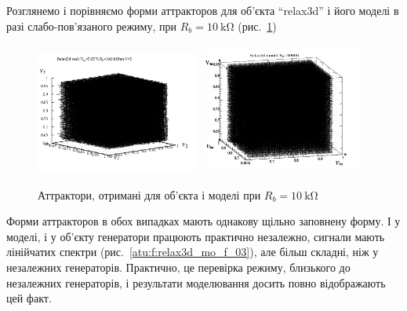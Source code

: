 Розглянемо і порівняємо форми аттракторов для об'єкта ``relax3d''
і його моделі в разі слабо-пов'язаного режиму, при
$ R_b = \SI{10}{\kilo \ohm} $ (рис.~\ref{atu:f:relax3d_mo_v1v2v3m_03})

\begin{figure}[htb!]
  \centerline{
    \hfill
    \includegraphics[width=0.48\textwidth]{p/relax3_v1v2v3_03.png}
    \hfill
    \includegraphics[width=0.48\textwidth]{p/relax3d_read_q-p_v1v2v3m_03a.png}
    \hfill
  }
\caption{Аттрактори, отримані для об'єкта і моделі при $ R_b = \SI{10}{\kilo \ohm} $}
\label{atu:f:relax3d_mo_v1v2v3m_03}
\end{figure}

Форми аттракторов в обох випадках мають однакову щільно
заповнену форму. І у моделі, і у об'єкту генератори працюють
практично незалежно, сигнали мають лінійчатих спектри
(рис.~\ref{atu:f:relax3d_mo_f_03}), але більш складні, ніж у незалежних
генераторів. Практично, це перевірка режиму, близького до
незалежних генераторів, і результати моделювання досить повно
відображають цей факт.


